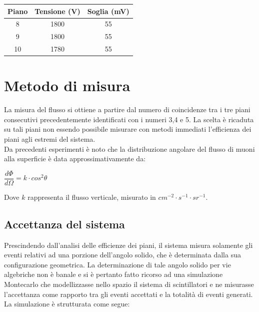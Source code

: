 \documentclass[11pt]{article}
\begin{document}
\begin{center}
\begin{tabular}{|c|c|c|}
\hline 
\textbf{Piano} & \textbf{Tensione (V)} & \textbf{Soglia (mV)} \\ 
\hline 
8 & 1800 & 55 \\ 
\hline 
9 & 1800 & 55 \\ 
\hline 
10 & 1780 & 55 \\ 
\hline 
\end{tabular} 

\end{center}

\section{Metodo di misura}
La misura del flusso si ottiene a partire dal numero di coincidenze tra i tre piani consecutivi precedentemente identificati con i numeri 3,4 e 5. La scelta è ricaduta su tali piani non essendo possibile misurare con metodi immediati l'efficienza dei piani agli estremi del sistema.\\
Da precedenti esperimenti \cite{PDG_cosquadro} è noto che la distribuzione angolare del flusso di muoni alla superficie è data approssimativamente da:\\

\begin{center}
$\dfrac{d\Phi}{d\Omega}=k\cdot cos^2 \theta$\\
\end{center}

Dove $k$ rappresenta il flusso verticale, misurato in $cm^{-2} \cdot s^{-1} \cdot sr^{-1}$.\\



\subsection{Accettanza del sistema} \label{subsec:MC}
Prescindendo dall'analisi delle efficienze dei piani, il sistema misura solamente gli eventi relativi ad una porzione dell'angolo solido, che è determinata dalla sua configurazione geometrica. La determinazione di tale angolo solido per vie algebriche non è banale e si è pertanto fatto ricorso ad una simulazione Montecarlo che modellizzasse nello spazio il sistema di scintillatori e ne misurasse l'accettanza  come rapporto tra gli eventi accettati e la totalità di eventi generati. La simulazione è strutturata come segue:
\end{document}
